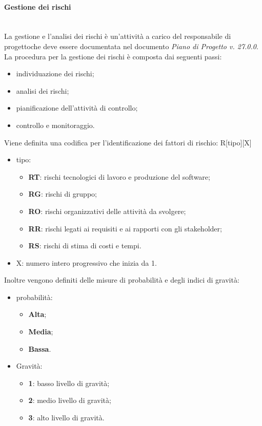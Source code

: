 		\paragraph{Gestione dei rischi}\mbox{}\\ [1mm]
		La gestione e l'analisi dei rischi è un'attività a carico del responsabile di progetto\glosp che deve essere documentata nel documento \textit{Piano di Progetto v. 27.0.0}.
		La procedura per la gestione dei rischi è composta dai seguenti passi:
		\begin{itemize}
			\item individuazione dei rischi;
			\item analisi dei rischi;
			\item pianificazione dell'attività di controllo;
			\item controllo e monitoraggio.
		\end{itemize}
		Viene definita una codifica per l'identificazione dei fattori di rischio: R[tipo][X]
		\begin{itemize}
			\item tipo:
			\begin{itemize}
				\item \textbf{RT}: rischi tecnologici di lavoro e produzione del software;
				\item \textbf{RG}: rischi di gruppo;
				\item \textbf{RO}: rischi organizzativi delle attività da svolgere;
				\item \textbf{RR}: rischi legati ai requisiti e ai rapporti con gli stakeholder\glo;
				\item \textbf{RS}: rischi di stima di costi e tempi.
			\end{itemize}
			\item X: numero intero progressivo che inizia da 1.
		\end{itemize}
		Inoltre vengono definiti delle misure di probabilità e degli indici di gravità:
		\begin{itemize}
			\item probabilità:
			\begin{itemize}
				\item \textbf{Alta};
				\item \textbf{Media};
				\item \textbf{Bassa}.
			\end{itemize}
			\item Gravità:
			\begin{itemize}
				\item \textbf{1}: basso livello di gravità;
				\item \textbf{2}: medio livello di gravità;
				\item \textbf{3}: alto livello di gravità.
			\end{itemize}
		\end{itemize}
